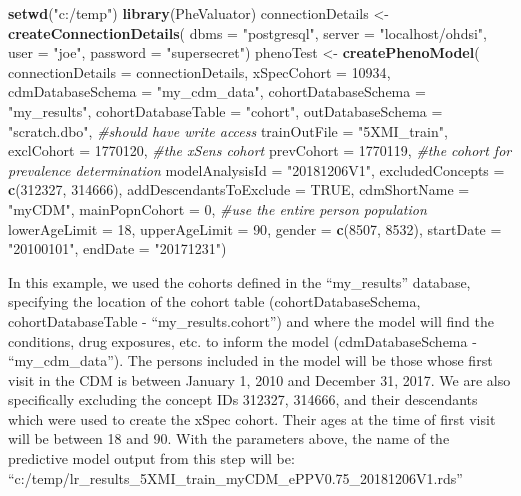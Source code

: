 \documentclass[11pt]{book}
\newenvironment{Shaded}{\begin{snugshade}}{\end{snugshade}}
\newcommand{\KeywordTok}[1]{\textcolor[rgb]{0.13,0.29,0.53}{\textbf{#1}}}
\newcommand{\DataTypeTok}[1]{\textcolor[rgb]{0.13,0.29,0.53}{#1}}
\newcommand{\DecValTok}[1]{\textcolor[rgb]{0.00,0.00,0.81}{#1}}
\newcommand{\StringTok}[1]{\textcolor[rgb]{0.31,0.60,0.02}{#1}}
\newcommand{\CommentTok}[1]{\textcolor[rgb]{0.56,0.35,0.01}{\textit{#1}}}
\newcommand{\OtherTok}[1]{\textcolor[rgb]{0.56,0.35,0.01}{#1}}
\newcommand{\NormalTok}[1]{#1}
\theoremstyle{definition}
\theoremstyle{definition}
\theoremstyle{definition}
\theoremstyle{remark}
\begin{document}
\begin{Shaded}
\begin{Highlighting}[]
\KeywordTok{setwd}\NormalTok{(}\StringTok{"c:/temp"}\NormalTok{)}
\KeywordTok{library}\NormalTok{(PheValuator)}
\NormalTok{connectionDetails <-}\StringTok{ }\KeywordTok{createConnectionDetails}\NormalTok{(}
  \DataTypeTok{dbms =} \StringTok{"postgresql"}\NormalTok{,}
  \DataTypeTok{server =} \StringTok{"localhost/ohdsi"}\NormalTok{,}
  \DataTypeTok{user =} \StringTok{"joe"}\NormalTok{,}
  \DataTypeTok{password =} \StringTok{"supersecret"}\NormalTok{)}
\NormalTok{phenoTest <-}\StringTok{ }\KeywordTok{createPhenoModel}\NormalTok{(}
  \DataTypeTok{connectionDetails =}\NormalTok{ connectionDetails,}
  \DataTypeTok{xSpecCohort =} \DecValTok{10934}\NormalTok{,}
  \DataTypeTok{cdmDatabaseSchema =} \StringTok{"my_cdm_data"}\NormalTok{,}
  \DataTypeTok{cohortDatabaseSchema =} \StringTok{"my_results"}\NormalTok{,}
  \DataTypeTok{cohortDatabaseTable =} \StringTok{"cohort"}\NormalTok{,}
  \DataTypeTok{outDatabaseSchema =} \StringTok{"scratch.dbo"}\NormalTok{, }\CommentTok{#should have write access}
  \DataTypeTok{trainOutFile =} \StringTok{"5XMI_train"}\NormalTok{,}
  \DataTypeTok{exclCohort =} \DecValTok{1770120}\NormalTok{, }\CommentTok{#the xSens cohort}
  \DataTypeTok{prevCohort =} \DecValTok{1770119}\NormalTok{, }\CommentTok{#the cohort for prevalence determination}
  \DataTypeTok{modelAnalysisId =} \StringTok{"20181206V1"}\NormalTok{,}
  \DataTypeTok{excludedConcepts =} \KeywordTok{c}\NormalTok{(}\DecValTok{312327}\NormalTok{, }\DecValTok{314666}\NormalTok{),}
  \DataTypeTok{addDescendantsToExclude =} \OtherTok{TRUE}\NormalTok{,}
  \DataTypeTok{cdmShortName =} \StringTok{"myCDM"}\NormalTok{,}
  \DataTypeTok{mainPopnCohort =} \DecValTok{0}\NormalTok{, }\CommentTok{#use the entire person population}
  \DataTypeTok{lowerAgeLimit =} \DecValTok{18}\NormalTok{,}
  \DataTypeTok{upperAgeLimit =} \DecValTok{90}\NormalTok{,}
  \DataTypeTok{gender =} \KeywordTok{c}\NormalTok{(}\DecValTok{8507}\NormalTok{, }\DecValTok{8532}\NormalTok{),}
  \DataTypeTok{startDate =} \StringTok{"20100101"}\NormalTok{,}
  \DataTypeTok{endDate =} \StringTok{"20171231"}\NormalTok{)}
\end{Highlighting}
\end{Shaded}

In this example, we used the cohorts defined in the ``my\_results''
database, specifying the location of the cohort table
(cohortDatabaseSchema, cohortDatabaseTable - ``my\_results.cohort'') and
where the model will find the conditions, drug exposures, etc. to inform
the model (cdmDatabaseSchema - ``my\_cdm\_data''). The persons included
in the model will be those whose first visit in the CDM is between
January 1, 2010 and December 31, 2017. We are also specifically
excluding the concept IDs 312327, 314666, and their descendants which
were used to create the xSpec cohort. Their ages at the time of first
visit will be between 18 and 90. With the parameters above, the name of
the predictive model output from this step will be:
``c:/temp/lr\_results\_5XMI\_train\_myCDM\_ePPV0.75\_20181206V1.rds''
\end{document}

